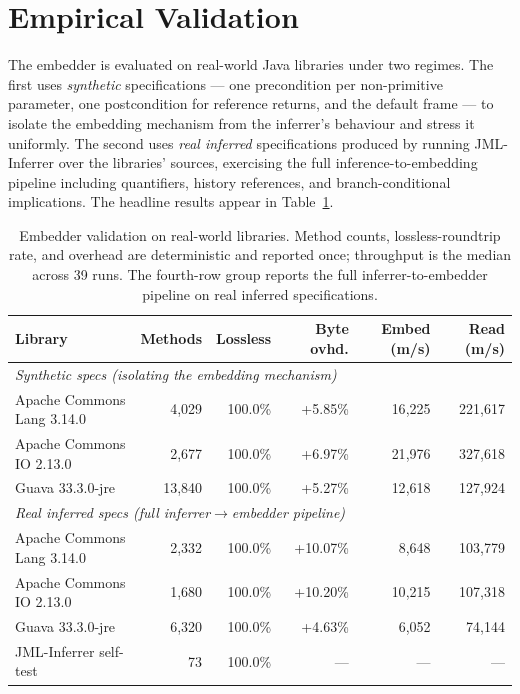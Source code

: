 \section{Empirical Validation}
\label{sec:dist-results}

The embedder is evaluated on real-world Java libraries under two regimes. The
first uses \emph{synthetic} specifications --- one precondition per non-primitive
parameter, one postcondition for reference returns, and the default frame ---
to isolate the embedding mechanism from the inferrer's behaviour and stress it
uniformly. The second uses \emph{real inferred} specifications produced by
running JML-Inferrer over the libraries' sources, exercising the full
inference-to-embedding pipeline including quantifiers, history references, and
branch-conditional implications. The headline results appear in
Table~\ref{tab:dist-validation}.

\begin{table}[ht]
\centering
\caption{Embedder validation on real-world libraries. Method counts,
lossless-roundtrip rate, and overhead are deterministic and reported once;
throughput is the median across 39 runs. The fourth-row group reports the full
inferrer-to-embedder pipeline on real inferred specifications.}
\label{tab:dist-validation}
\begin{tabular}{lrrrrr}
\toprule
\textbf{Library} & \textbf{Methods} & \textbf{Lossless} & \textbf{Byte ovhd.} & \textbf{Embed (m/s)} & \textbf{Read (m/s)} \\
\midrule
\multicolumn{6}{l}{\textit{Synthetic specs (isolating the embedding mechanism)}} \\
Apache Commons Lang 3.14.0 & 4{,}029 & 100.0\% & +5.85\% & 16{,}225 & 221{,}617 \\
Apache Commons IO 2.13.0 & 2{,}677 & 100.0\% & +6.97\% & 21{,}976 & 327{,}618 \\
Guava 33.3.0-jre & 13{,}840 & 100.0\% & +5.27\% & 12{,}618 & 127{,}924 \\
\midrule
\multicolumn{6}{l}{\textit{Real inferred specs (full inferrer$\to$embedder pipeline)}} \\
Apache Commons Lang 3.14.0 & 2{,}332 & 100.0\% & +10.07\% & 8{,}648 & 103{,}779 \\
Apache Commons IO 2.13.0   & 1{,}680 & 100.0\% & +10.20\% & 10{,}215 & 107{,}318 \\
Guava 33.3.0-jre           & 6{,}320 & 100.0\% & +4.63\%  & 6{,}052 & 74{,}144 \\
JML-Inferrer self-test     & 73    & 100.0\% & --- & --- & --- \\
\bottomrule
\end{tabular}
\end{table}

